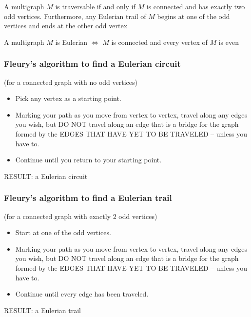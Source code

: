 \documentclass[aspectratio=43]{beamer}
\begin{document}
\begin{frame}
\begin{theorem}
	A multigraph $M$ is traversable if and only if $M$ is connected and has exactly two odd vertices. Furthermore, any Eulerian trail of $M$ begins at one of the odd vertices and ends at the other odd vertex
\end{theorem}
\vfill
\begin{theorem}
	A multigraph $M$ is Eulerian $\iff$ $M$ is connected and every vertex of $M$ is even
\end{theorem}
\end{frame}




\begin{frame}\frametitle{Fleury's algorithm to find a Eulerian circuit}
(for a connected graph with no odd vertices)

\begin{itemize}
	\item Pick any vertex as a starting point.
	\item Marking your path as you move from vertex to vertex, travel along any edges you wish, but DO NOT travel along an edge that is a bridge for the graph formed by the EDGES THAT HAVE YET TO BE TRAVELED -- unless you have to.
	\item Continue until you return to your starting point.
\end{itemize}
RESULT: a Eulerian circuit
\end{frame}


\begin{frame}\frametitle{Fleury's algorithm to find a Eulerian trail}
(for a connected graph with exactly 2 odd vertices)

\begin{itemize}
	\item Start at one of the odd vertices.
	\item Marking your path as you move from vertex to vertex, travel along any edges you wish, but DO NOT travel along an edge that is a bridge for the graph formed by the EDGES THAT HAVE YET TO BE TRAVELED -- unless you have to.
	\item Continue until every edge has been traveled.
\end{itemize}
RESULT: a Eulerian trail
\end{frame}
\end{document}
